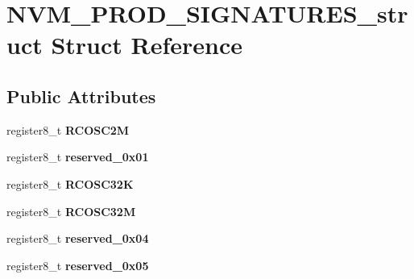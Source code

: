 \hypertarget{struct_n_v_m___p_r_o_d___s_i_g_n_a_t_u_r_e_s__struct}{}\section{N\+V\+M\+\_\+\+P\+R\+O\+D\+\_\+\+S\+I\+G\+N\+A\+T\+U\+R\+E\+S\+\_\+struct Struct Reference}
\label{struct_n_v_m___p_r_o_d___s_i_g_n_a_t_u_r_e_s__struct}
\subsection*{Public Attributes}
\begin{DoxyCompactItemize}
\item 
register8\+\_\+t {\bfseries R\+C\+O\+S\+C2M}\hypertarget{struct_n_v_m___p_r_o_d___s_i_g_n_a_t_u_r_e_s__struct_ada9463cb389ef6972078fb0159808616}{}\label{struct_n_v_m___p_r_o_d___s_i_g_n_a_t_u_r_e_s__struct_ada9463cb389ef6972078fb0159808616}

\item 
register8\+\_\+t {\bfseries reserved\+\_\+0x01}\hypertarget{struct_n_v_m___p_r_o_d___s_i_g_n_a_t_u_r_e_s__struct_a042bf0b3c83cccc0a65d6e3c5b233207}{}\label{struct_n_v_m___p_r_o_d___s_i_g_n_a_t_u_r_e_s__struct_a042bf0b3c83cccc0a65d6e3c5b233207}

\item 
register8\+\_\+t {\bfseries R\+C\+O\+S\+C32K}\hypertarget{struct_n_v_m___p_r_o_d___s_i_g_n_a_t_u_r_e_s__struct_a9e6e4f803a5cb9630dcf36905d4f6f93}{}\label{struct_n_v_m___p_r_o_d___s_i_g_n_a_t_u_r_e_s__struct_a9e6e4f803a5cb9630dcf36905d4f6f93}

\item 
register8\+\_\+t {\bfseries R\+C\+O\+S\+C32M}\hypertarget{struct_n_v_m___p_r_o_d___s_i_g_n_a_t_u_r_e_s__struct_a1087209382fc625bbc0620d837e7d1aa}{}\label{struct_n_v_m___p_r_o_d___s_i_g_n_a_t_u_r_e_s__struct_a1087209382fc625bbc0620d837e7d1aa}

\item 
register8\+\_\+t {\bfseries reserved\+\_\+0x04}\hypertarget{struct_n_v_m___p_r_o_d___s_i_g_n_a_t_u_r_e_s__struct_ad82ca4471f2d41fe3a47c132413f74a7}{}\label{struct_n_v_m___p_r_o_d___s_i_g_n_a_t_u_r_e_s__struct_ad82ca4471f2d41fe3a47c132413f74a7}

\item 
register8\+\_\+t {\bfseries reserved\+\_\+0x05}\hypertarget{struct_n_v_m___p_r_o_d___s_i_g_n_a_t_u_r_e_s__struct_a41f54893951aec63b2566a55b6507ef2}{}\label{struct_n_v_m___p_r_o_d___s_i_g_n_a_t_u_r_e_s__struct_a41f54893951aec63b2566a55b6507ef2}


\end{DoxyCompactItemize}
